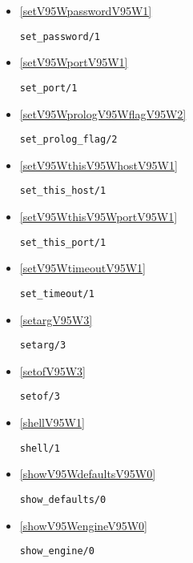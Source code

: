 \begin{itemize}
\item \ref{setV95WpasswordV95W1} 
\begin{verbatim}
set_password/1
\end{verbatim}

\item \ref{setV95WportV95W1} 
\begin{verbatim}
set_port/1
\end{verbatim}

\item \ref{setV95WprologV95WflagV95W2} 
\begin{verbatim}
set_prolog_flag/2
\end{verbatim}

\item \ref{setV95WthisV95WhostV95W1} 
\begin{verbatim}
set_this_host/1
\end{verbatim}

\item \ref{setV95WthisV95WportV95W1} 
\begin{verbatim}
set_this_port/1
\end{verbatim}

\item \ref{setV95WtimeoutV95W1} 
\begin{verbatim}
set_timeout/1
\end{verbatim}

\item \ref{setargV95W3} 
\begin{verbatim}
setarg/3
\end{verbatim}

\item \ref{setofV95W3} 
\begin{verbatim}
setof/3
\end{verbatim}

\item \ref{shellV95W1} 
\begin{verbatim}
shell/1
\end{verbatim}

\item \ref{showV95WdefaultsV95W0} 
\begin{verbatim}
show_defaults/0
\end{verbatim}

\item \ref{showV95WengineV95W0} 
\begin{verbatim}
show_engine/0
\end{verbatim}


\end{itemize}
